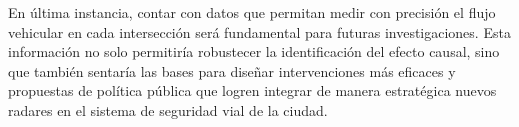 En última instancia, contar con datos que permitan medir con precisión el flujo vehicular en cada intersección será fundamental para futuras investigaciones. Esta información no solo permitiría robustecer la identificación del efecto causal, sino que también sentaría las bases para diseñar intervenciones más eficaces y propuestas de política pública que logren integrar de manera estratégica nuevos radares en el sistema de seguridad vial de la ciudad.
